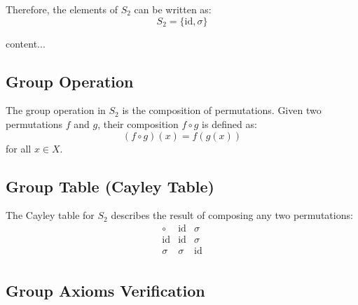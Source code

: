 \begin{exercise}
\begin{itemize}
{}
\end{itemize}

Therefore, the elements of \( S_2 \) can be written as:
\[
S_2 = \{ \text{id}, \sigma \}
\]

\end{exercise}
\vspace{12pt}
\begin{exercise}
	content...
\end{exercise}

\subsection*{Group Operation}

The group operation in \( S_2 \) is the composition of permutations. Given two permutations \( f \) and \( g \), their composition \( f \circ g \) is defined as:
\[
(f \circ g)(x) = f(g(x))
\]
for all \( x \in X \).

\subsection*{Group Table (Cayley Table)}

The Cayley table for \( S_2 \) describes the result of composing any two permutations:
\[
\begin{array}{c|cc}
	\circ & \text{id} & \sigma \\
	\hline
	\text{id} & \text{id} & \sigma \\
	\sigma & \sigma & \text{id} \\
\end{array}
\]

\subsection*{Group Axioms Verification}

